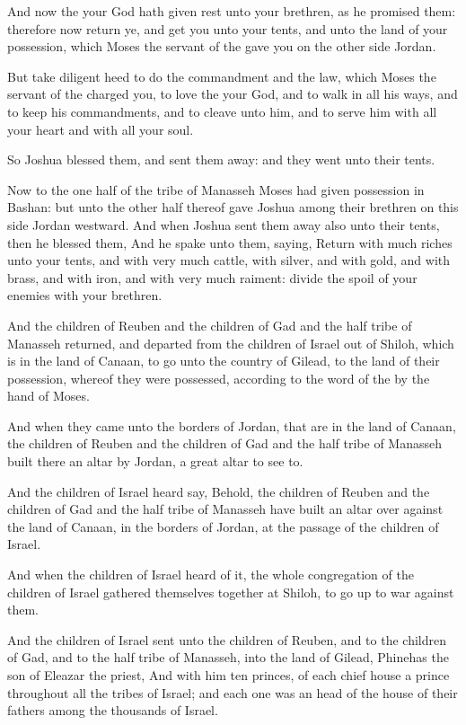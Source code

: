 \Verse And now the \LORD your God hath given rest unto your brethren, as he promised them: therefore now return ye, and get you unto your tents, and unto the land of your possession, which Moses the servant of the \LORD gave you on the other side Jordan.

\Verse But take diligent heed to do the commandment and the law, which Moses the servant of the \LORD charged you, to love the \LORD your God, and to walk in all his ways, and to keep his commandments, and to cleave unto him, and to serve him with all your heart and with all your soul.

\Verse So Joshua blessed them, and sent them away: and they went unto their tents.

\Verse Now to the one half of the tribe of Manasseh Moses had given possession in Bashan: but unto the other half thereof gave Joshua among their brethren on this side Jordan westward. And when Joshua sent them away also unto their tents, then he blessed them, \Verse And he spake unto them, saying, Return with much riches unto your tents, and with very much cattle, with silver, and with gold, and with brass, and with iron, and with very much raiment: divide the spoil of your enemies with your brethren.

\Verse And the children of Reuben and the children of Gad and the half tribe of Manasseh returned, and departed from the children of Israel out of Shiloh, which is in the land of Canaan, to go unto the country of Gilead, to the land of their possession, whereof they were possessed, according to the word of the \LORD by the hand of Moses.

\Verse And when they came unto the borders of Jordan, that are in the land of Canaan, the children of Reuben and the children of Gad and the half tribe of Manasseh built there an altar by Jordan, a great altar to see to.

\Verse And the children of Israel heard say, Behold, the children of Reuben and the children of Gad and the half tribe of Manasseh have built an altar over against the land of Canaan, in the borders of Jordan, at the passage of the children of Israel.

\Verse And when the children of Israel heard of it, the whole congregation of the children of Israel gathered themselves together at Shiloh, to go up to war against them.

\Verse And the children of Israel sent unto the children of Reuben, and to the children of Gad, and to the half tribe of Manasseh, into the land of Gilead, Phinehas the son of Eleazar the priest, \Verse And with him ten princes, of each chief house a prince throughout all the tribes of Israel; and each one was an head of the house of their fathers among the thousands of Israel.

